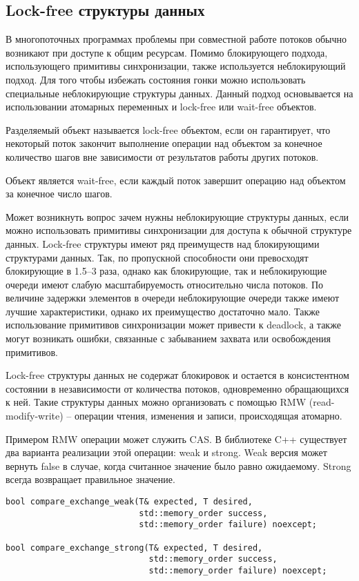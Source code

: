 \subsection{Lock-free структуры данных}
\label{lockfree:section}
	
В многопоточных программах проблемы при совместной работе потоков обычно возникают при доступе к общим ресурсам. Помимо блокирующего подхода, использующего примитивы синхронизации, также используется неблокирующий подход. Для того чтобы избежать состояния гонки можно использовать специальные неблокирующие структуры данных. Данный подход основывается на использовании атомарных переменных и lock-free или wait-free объектов.
	
Разделяемый объект называется lock-free объектом, если он гарантирует, что некоторый поток закончит выполнение операции над объектом за конечное количество шагов вне зависимости от результатов работы других потоков.
	
Объект является wait-free, если каждый поток завершит операцию над объектом за конечное число шагов.
	
Может возникнуть вопрос зачем нужны неблокирующие структуры данных, если можно использовать примитивы синхронизации для доступа к обычной структуре данных. Lock-free структуры имеют ряд преимуществ над блокирующими структурами данных. Так, по пропускной способности они превосходят блокирующие в 1.5--3 раза, однако как блокирующие, так и неблокирующие очереди имеют слабую масштабируемость относительно числа потоков. По величине задержки элементов в очереди неблокирующие очереди также имеют лучшие характеристики, однако их преимущество достаточно мало. Также использование примитивов синхронизации может привести к deadlock, а также могут возникать ошибки, связанные с забыванием захвата или освобождения примитивов.
	
Lock-free структуры данных не содержат блокировок и остается в консистентном состоянии в независимости от количества потоков, одновременно обращающихся к ней. Такие структуры данных можно организовать с помощью RMW (read-modify-write) -- операции чтения, изменения и записи, происходящая атомарно.
	
Примером RMW операции может служить CAS. В библиотеке C++ существует два варианта реализации этой операции: weak и strong. Weak версия может вернуть false в случае, когда считанное значение было равно ожидаемому. Strong всегда возвращает правильное значение.

\begin{verbatim}
bool compare_exchange_weak(T& expected, T desired, 
                           std::memory_order success, 
                           std::memory_order failure) noexcept;

bool compare_exchange_strong(T& expected, T desired, 
                             std::memory_order success, 
                             std::memory_order failure) noexcept;
\end{verbatim}

